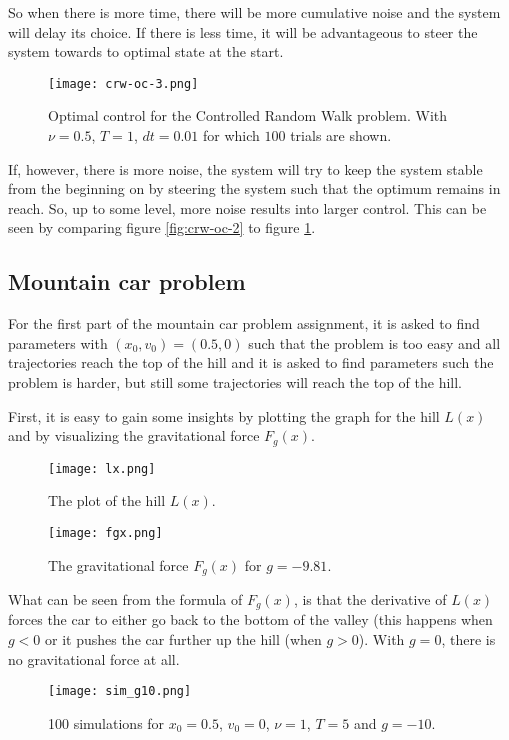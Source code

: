 \documentclass[10pt,a4paper]{article}
\begin{document}
So when there is more time, there will be more cumulative noise and the system will delay its choice. If there is less time, it will be advantageous to steer the system towards to optimal state at the start.

\begin{figure}[h]
\centering
\texttt{[image: crw-oc-3.png]}
\caption{Optimal control for the Controlled Random Walk problem. With $\nu=0.5$, $T=1$, $dt=0.01$ for which $100$ trials are shown.}
\label{fig:crw-oc-3}
\end{figure}

If, however, there is more noise, the system will try to keep the system stable from the beginning on by steering the system such that the optimum remains in reach. So, up to some level, more noise results into larger control. This can be seen by comparing figure \ref{fig:crw-oc-2} to figure \ref{fig:crw-oc-3}.

\subsection{Mountain car problem}
For the first part of the mountain car problem assignment, it is asked to find parameters with $(x_0, v_0) = (0.5, 0)$ such that the problem is too easy and all trajectories reach the top of the hill and it is asked to find parameters such the problem is harder, but still some trajectories will reach the top of the hill.

First, it is easy to gain some insights by plotting the graph for the hill $L(x)$ and by visualizing the gravitational force $F_g(x)$.

\begin{figure}[h]
\centering
\texttt{[image: lx.png]}
\caption{The plot of the hill $L(x)$.}
\label{fig:mcp-fgx}
\end{figure}

\begin{figure}[h]
\centering
\texttt{[image: fgx.png]}
\caption{The gravitational force $F_g(x)$ for $g=-9.81$.}
\label{fig:mcp-fgx}
\end{figure}

What can be seen from the formula of $F_g(x)$, is that the derivative of $L(x)$ forces the car to either go back to the bottom of the valley (this happens when $g < 0$ or it pushes the car further up the hill (when $g > 0$). With $g = 0$, there is no gravitational force at all.

\begin{figure}[h]
\centering
\texttt{[image: sim\_g10.png]}
\caption{100 simulations for $x_0 = 0.5$, $v_0=0$, $\nu=1$, $T=5$ and $g=-10$.}
\label{fig:mcp-g10}
\end{figure}
\end{document}
